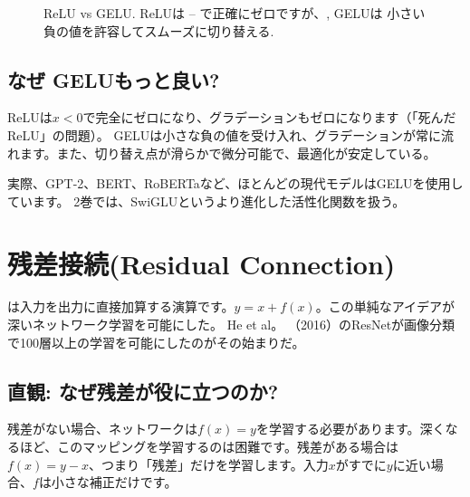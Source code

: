 \begin{figure}[htbp]
\centering
{}
\caption{ReLU vs GELU. ReLUは   --  で正確にゼロですが、, GELUは 小さい負の値を許容してスムーズに切り替える.}
\label{fig:gelu-relu}
\end{figure}

\subsection{なぜ GELUもっと良い?}

ReLUは$x < 0$で完全にゼロになり、グラデーションもゼロになります（「死んだReLU」の問題）。 GELUは小さな負の値を受け入れ、グラデーションが常に流れます。また、切り替え点が滑らかで微分可能で、最適化が安定している。

実際、GPT-2、BERT、RoBERTaなど、ほとんどの現代モデルはGELUを使用しています。 2巻では、SwiGLUというより進化した活性化関数を扱う。

\section{残差接続(Residual Connection)}

は入力を出力に直接加算する演算です。$y = x + f(x)$。この単純なアイデアが深いネットワーク学習を可能にした。 He et al。 （2016）のResNetが画像分類で100層以上の学習を可能にしたのがその始まりだ。

\subsection{直観: なぜ残差が役に立つのか?}

残差がない場合、ネットワークは$f(x) = y$を学習する必要があります。深くなるほど、このマッピングを学習するのは困難です。残差がある場合は$f(x) = y - x$、つまり「残差」だけを学習します。入力$x$がすでに$y$に近い場合、$f$は小さな補正だけです。

